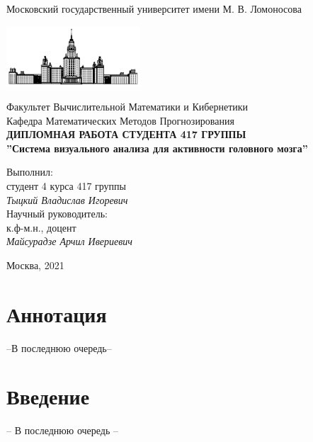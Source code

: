 \documentclass[12pt]{article}
\begin{document}
\begin{titlepage}
    \begin{center}
        Московский государственный университет имени М. В. Ломоносова
    
        \bigskip
        \includegraphics[width=50mm]{msu.pdf}
    
        \bigskip
        Факультет Вычислительной Математики и Кибернетики\\
        Кафедра Математических Методов Прогнозирования\\[10mm]
    
        {\large\bfseries
            ДИПЛОМНАЯ РАБОТА СТУДЕНТА 417 ГРУППЫ\\[10mm]
            ''Система визуального анализа для активности головного мозга''}
        \\[80mm]
        
    
        \begin{flushright}
            \parbox{0.4\textwidth}{
                Выполнил:\\
                студент 4 курса 417 группы\\
                \emph{Тыцкий Владислав Игоревич}\\[5mm]
                Научный руководитель:\\
                к.ф-м.н., доцент\\
                \emph{Майсурадзе Арчил Ивериевич}
            }
        \end{flushright}
    
        \vspace{\fill}
        Москва, 2021
    \end{center}
\end{titlepage}


\section*{Аннотация}
--В последнюю очередь--

\newpage

\tableofcontents

\newpage

\section{Введение}
-- В последнюю очередь --
\end{document}
